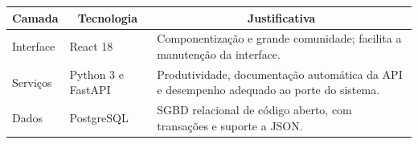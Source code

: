 \begin{quadro}[htbp]
\begin{ilustracao}{\caption{Tecnologias empregadas e justificativas (exemplo)}\label{qua:guia-tecnologias}}{\elaboracaopropria}
  \renewcommand{\arraystretch}{1.25}
  \small
  \begin{tabularx}{\textwidth}{|l|l|X|}
    \hline
    \multicolumn{1}{|c|}{\textbf{Camada}} & \multicolumn{1}{c|}{\textbf{Tecnologia}} & \multicolumn{1}{c|}{\textbf{Justificativa}} \\
    \hline
    Interface & React 18 & Componentização e grande comunidade; facilita a manutenção da interface. \\
    \hline
    Serviços & Python 3 e FastAPI & Produtividade, documentação automática da API e desempenho adequado ao porte do sistema. \\
    \hline
    Dados & PostgreSQL & SGBD relacional de código aberto, com transações e suporte a JSON. \\
    \hline
  \end{tabularx}
\end{ilustracao}
\end{quadro}
